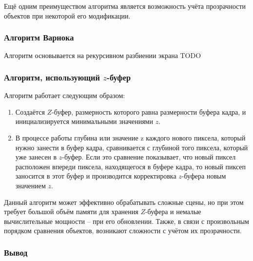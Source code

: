 Ещё одним преимуществом алгоритма является возможность учёта прозрачности
объектов при некоторой его модификации.

\subsubsection{Алгоритм Варнока}

Алгоритм основывается на рекурсивном разбиении экрана TODO

\subsubsection{Алгоритм, использующий $z$-буфер}

Алгоритм работает следующим образом:
\begin{enumerate}
    \item Создаётся $Z$-буфер, размерность которого равна размерности буфера
        кадра, и инициализируется минимальными значениями $z$.
    \item В процессе работы глубина или значение z каждого нового пиксела,
        который нужно занести в буфер кадра, сравнивается с глубиной того
        пиксела, который уже занесен в $z$-буфер. Если это сравнение
        показывает, что новый пиксел расположен впереди пиксела, находящегося в
        буфере кадра, то новый пиксеп заносится в этот буфер и производится
        корректировка $z$-буфера новым значением $z$. \cite[с.~321]{rogers}
\end{enumerate}

Данный алгоритм может эффективно обрабатывать сложные сцены, но при этом
требует большой объём памяти для хранения $Z$-буфера и немалые вычислительные
мощности -- при его обновлении. Также, в связи с произвольным порядком
сравнения объектов, возникают сложности с учётом их прозрачности.

\subsubsection{Вывод}

